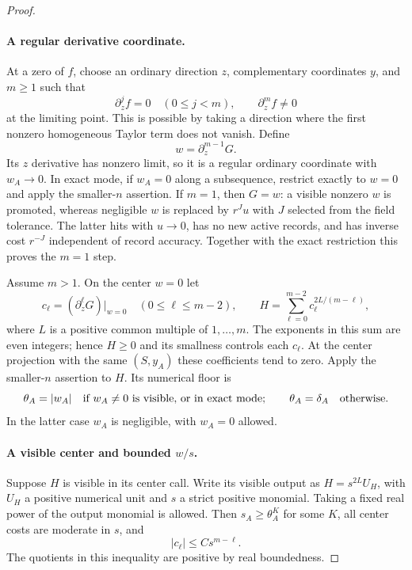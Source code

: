 \begin{proof}
\paragraph{A regular derivative coordinate.}
At a zero of $f$, choose an ordinary direction $z$, complementary
coordinates $y$, and $m\ge1$ such that
\[
 \partial_z^jf=0\quad(0\le j<m),\qquad
 \partial_z^mf\ne0
\]
at the limiting point.  This is possible by taking a direction where
the first nonzero homogeneous Taylor term does not vanish.  Define
\begin{equation}\label{eq:elimination-w}
 w=\partial_z^{m-1}G.
\end{equation}
Its $z$ derivative has nonzero limit, so it is a regular ordinary
coordinate with $w_A\to0$.  In exact mode, if $w_A=0$ along a
subsequence, restrict exactly to $w=0$ and apply the smaller-$n$
assertion.  If $m=1$, then $G=w$: a visible nonzero $w$ is promoted,
whereas negligible $w$ is replaced by $r^Ju$ with $J$ selected from
the field tolerance.  The latter hits with $u\to0$, has no new active
records, and has inverse cost $r^{-J}$ independent of record accuracy.
Together with the exact restriction this proves the $m=1$ step.

Assume $m>1$.  On the center $w=0$ let
\begin{equation}\label{eq:elimination-H}
 c_\ell=(\partial_z^\ell G)|_{w=0}\quad(0\le\ell\le m-2),
 \qquad
 H=\sum_{\ell=0}^{m-2}c_\ell^{2L/(m-\ell)},
\end{equation}
where $L$ is a positive common multiple of $1,\ldots,m$.
The exponents in this sum are even integers; hence $H\ge0$ and
its smallness controls each $c_\ell$.  At the center projection with
the same $(S,y_A)$ these coefficients tend to zero.  Apply the
smaller-$n$ assertion to $H$.  Its numerical floor is
\begin{equation}\label{eq:elimination-theta}
 \theta_A=|w_A|
 \quad\hbox{if $w_A\ne0$ is visible, or in exact mode};
 \qquad
 \theta_A=\delta_A\quad\hbox{otherwise}.
\end{equation}
In the latter case $w_A$ is negligible, with $w_A=0$ allowed.

\paragraph{A visible center and bounded $w/s$.}
Suppose $H$ is visible in its center call.  Write its visible output
as $H=s^{2L}U_H$, with $U_H$ a positive numerical unit and $s$ a
strict positive monomial.  Taking a fixed real power of the output
monomial is allowed.  Then $s_A\ge\theta_A^K$ for some $K$, all
center costs are moderate in $s$, and
\begin{equation}\label{eq:elimination-c-bounds}
 |c_\ell|\le C s^{m-\ell}.
\end{equation}
The quotients in this inequality are positive by real boundedness.


\end{proof}
